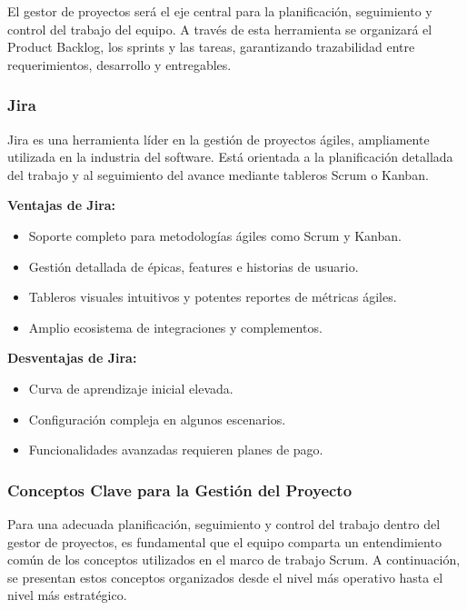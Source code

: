 \documentclass[12pt]{article}
\begin{document}
El gestor de proyectos será el eje central para la planificación, seguimiento y control del trabajo del equipo. A través de esta herramienta se organizará el Product Backlog, los sprints y las tareas, garantizando trazabilidad entre requerimientos, desarrollo y entregables.

\subsubsection{Jira}

Jira es una herramienta líder en la gestión de proyectos ágiles, ampliamente utilizada en la industria del software. Está orientada a la planificación detallada del trabajo y al seguimiento del avance mediante tableros Scrum o Kanban.

\textbf{Ventajas de Jira:}
\begin{itemize}
    \item Soporte completo para metodologías ágiles como Scrum y Kanban.
    \item Gestión detallada de épicas, features e historias de usuario.
    \item Tableros visuales intuitivos y potentes reportes de métricas ágiles.
    \item Amplio ecosistema de integraciones y complementos.
\end{itemize}

\textbf{Desventajas de Jira:}
\begin{itemize}
    \item Curva de aprendizaje inicial elevada.
    \item Configuración compleja en algunos escenarios.
    \item Funcionalidades avanzadas requieren planes de pago.
\end{itemize}



\subsubsection{Conceptos Clave para la Gestión del Proyecto}

Para una adecuada planificación, seguimiento y control del trabajo dentro del gestor de proyectos, es fundamental que el equipo comparta un entendimiento común de los conceptos utilizados en el marco de trabajo Scrum. A continuación, se presentan estos conceptos organizados desde el nivel más operativo hasta el nivel más estratégico.
\end{document}
